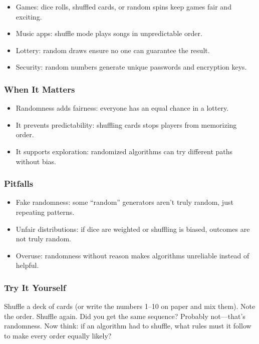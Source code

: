 \documentclass[
  letterpaper,
  DIV=11,
  numbers=noendperiod]{scrreprt}
\providecommand{\tightlist}{%
  \setlength{\itemsep}{0pt}\setlength{\parskip}{0pt}}
\begin{document}
\begin{itemize}
\tightlist
\item
  Games: dice rolls, shuffled cards, or random spins keep games fair and
  exciting.
\item
  Music apps: shuffle mode plays songs in unpredictable order.
\item
  Lottery: random draws ensure no one can guarantee the result.
\item
  Security: random numbers generate unique passwords and encryption
  keys.
\end{itemize}

\subsubsection{When It Matters}\label{when-it-matters-19}

\begin{itemize}
\tightlist
\item
  Randomness adds fairness: everyone has an equal chance in a lottery.
\item
  It prevents predictability: shuffling cards stops players from
  memorizing order.
\item
  It supports exploration: randomized algorithms can try different paths
  without bias.
\end{itemize}

\subsubsection{Pitfalls}\label{pitfalls-18}

\begin{itemize}
\tightlist
\item
  Fake randomness: some ``random'' generators aren't truly random, just
  repeating patterns.
\item
  Unfair distributions: if dice are weighted or shuffling is biased,
  outcomes are not truly random.
\item
  Overuse: randomness without reason makes algorithms unreliable instead
  of helpful.
\end{itemize}

\subsubsection{Try It Yourself}\label{try-it-yourself-21}

Shuffle a deck of cards (or write the numbers 1--10 on paper and mix
them). Note the order. Shuffle again. Did you get the same sequence?
Probably not---that's randomness. Now think: if an algorithm had to
shuffle, what rules must it follow to make every order equally likely?
\end{document}
